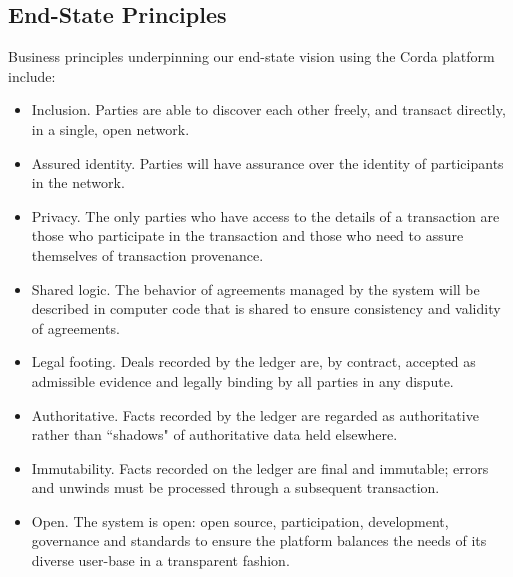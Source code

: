 \documentclass{article}
\begin{document}
\subsection{End-State Principles}
Business principles underpinning our end-state vision using the Corda platform include:
\begin{itemize}
    \item Inclusion. Parties are able to discover each other freely, and transact directly, in a single, open network.
    \item Assured identity. Parties will have assurance over the identity of participants in the network.
    \item Privacy. The only parties who have access to the details of a transaction are those who participate in the transaction and those who need to assure themselves of transaction provenance.
    \item Shared logic. The behavior of agreements managed by the system will be described in computer code that is shared to ensure consistency and validity of agreements.
    \item Legal footing. Deals recorded by the ledger are, by contract, accepted as admissible evidence and legally binding by all parties in any dispute.\cite{Ricardian}
	\item Authoritative. Facts recorded by the ledger are regarded as authoritative rather than ``shadows" of authoritative data held elsewhere.
	\item Immutability. Facts recorded on the ledger are final and immutable; errors and unwinds must be processed through a subsequent transaction.
    \item Open. The system is open: open source, participation, development, governance and standards to ensure the platform balances the needs of its diverse user-base in a transparent fashion.
\end{itemize}
\paragraph{}
\end{document}
